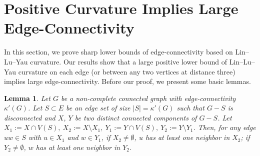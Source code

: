 \documentclass[10pt,a4paper]{article}
\newtheorem{theorem}{Theorem}[section]
\newtheorem{lemma}{Lemma}[section]
\theoremstyle{definition}
\theoremstyle{definition}
\theoremstyle{nonumber}
\newtheorem*{theorem*}{Theorem}
\begin{document}


\section{Positive Curvature Implies Large Edge-Connectivity}\label{section}



In this section, we prove sharp lower bounds of edge-connectivity based on Lin--Lu--Yau curvature. Our results show that a large positive lower bound of Lin--Lu--Yau curvature on each edge (or between any two vertices at distance three) implies large edge-connectivity. Before our proof, we present some basic lemmas.

\begin{lemma} \label{neighbor}
Let $G$ be a non-complete connected graph with edge-connectivity $\kappa'(G)$. Let $S \subset E$ be an edge set of size $|S| = \kappa'(G)$ such that $G - S$ is disconnected and $X$, $Y$ be two distinct connected components of $G - S$. Let $X_1:=X\cap V(S),\ X_2:=X \setminus X_1,\ Y_1:=Y\cap V(S),\ Y_2:=Y \setminus Y_1$. Then, for any edge $uw \in S$ with $u\in X_1$ and $w\in Y_1$, if $X_2\ne \emptyset$, $u$ has at least one neighbor in $X_2$; if $Y_2\ne \emptyset$, $w$ has at least one neighbor in $Y_2$.
\end{lemma}
\end{document}
